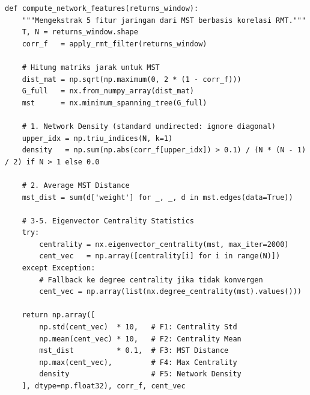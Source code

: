 \documentclass[12pt,a4paper]{article}
\begin{document}
\begin{lstlisting}[caption={Network Feature Engineering}]
def compute_network_features(returns_window):
    """Mengekstrak 5 fitur jaringan dari MST berbasis korelasi RMT."""
    T, N = returns_window.shape
    corr_f   = apply_rmt_filter(returns_window)
    
    # Hitung matriks jarak untuk MST
    dist_mat = np.sqrt(np.maximum(0, 2 * (1 - corr_f)))
    G_full   = nx.from_numpy_array(dist_mat)
    mst      = nx.minimum_spanning_tree(G_full)
    
    # 1. Network Density (standard undirected: ignore diagonal)
    upper_idx = np.triu_indices(N, k=1)
    density   = np.sum(np.abs(corr_f[upper_idx]) > 0.1) / (N * (N - 1) / 2) if N > 1 else 0.0
    
    # 2. Average MST Distance
    mst_dist = sum(d['weight'] for _, _, d in mst.edges(data=True))
    
    # 3-5. Eigenvector Centrality Statistics
    try:
        centrality = nx.eigenvector_centrality(mst, max_iter=2000)
        cent_vec   = np.array([centrality[i] for i in range(N)])
    except Exception:
        # Fallback ke degree centrality jika tidak konvergen
        cent_vec = np.array(list(nx.degree_centrality(mst).values()))
        
    return np.array([
        np.std(cent_vec)  * 10,   # F1: Centrality Std
        np.mean(cent_vec) * 10,   # F2: Centrality Mean
        mst_dist          * 0.1,  # F3: MST Distance
        np.max(cent_vec),         # F4: Max Centrality
        density                   # F5: Network Density
    ], dtype=np.float32), corr_f, cent_vec
\end{lstlisting}
\end{document}
